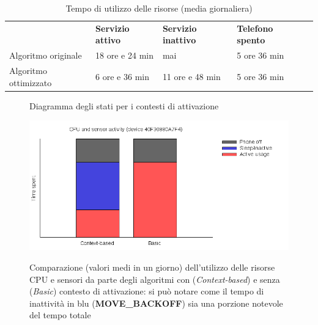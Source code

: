 \documentclass[a4paper,10pt]{memoir}
\begin{document}
\begin{table}[h]
\centering
\begin{tabular}{lllll}
& \textbf{Servizio attivo} & \textbf{Servizio inattivo} & \textbf{Telefono spento} &  \\
Algoritmo originale   & 18 ore e 24 min  & mai              & 5 ore 36 min &  \\
Algoritmo ottimizzato & 6 ore e 36 min   & 11 ore e 48 min  & 5 ore 36 min &
\end{tabular}
\caption{Tempo di utilizzo delle risorse (media giornaliera)}
\label{table:tempoutilizzo}
\end{table}

\begin{figure}[ht]
\centering
\caption{Diagramma degli stati per i contesti di attivazione}
\label{fig:scs_sm3}
\end{figure}

\begin{figure}[ht]
\centering
\caption{Comparazione (valori medi in un giorno) dell'utilizzo delle risorse CPU e sensori da parte degli algoritmi con (\textit{Context-based}) e senza (\textit{Basic}) contesto di attivazione: si può notare come il tempo di inattività in blu (\textbf{MOVE\_BACKOFF}) sia una porzione notevole del tempo totale}
\includegraphics[width=\textwidth]{database/usageplot}
\label{fig:usagechart}
\end{figure}
\end{document}
